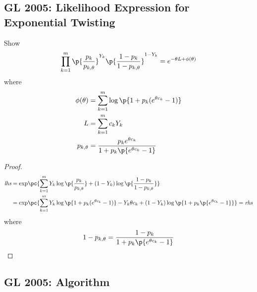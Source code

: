 \documentclass[11pt]{article}
\begin{document}
\newpage

\subsection*{GL 2005: Likelihood Expression for Exponential Twisting}

Show
\[
    \prod_{k=1}^m \p{\frac{p_k}{p_{k, \theta}}}^{Y_k} \p{\frac{1 - p_k}{1 - p_{k, \theta}}}^{1 - Y_k}
    = e^{-\theta L + \phi(\theta)}
\]
where
\begin{align*}
    \phi(\theta) 
        &= \sum_{k=1}^m \log \p{1 + p_k (e^{\theta c_k} - 1)} \\
    L 
        &= \sum_{k=1}^m c_kY_k    \\ 
    p_{k,\theta} 
        &= \frac{p_k e^{\theta c_k}}{1 + p_k\p{e^{\theta c_k}-1}}
\end{align*}
\begin{proof}
    \begin{align*}
        \textit{lhs}
        &= \text{exp} \pc{
            \sum_{k=1}^m Y_k \log \p{\frac{p_k}{p_{k,\theta}}} + (1 - Y_k) \log \p{\frac{1-p_k}{1-p_{k,\theta}}}
        } \\ 
        &= \text{exp} \pc{
            \sum_{k=1}^m Y_k \log \p{1 + p_k (e^{\theta c_k} - 1)} - Y_k \theta c_k + (1 - Y_k) \log \p{1 + p_k\p{e^{\theta c_k} - 1}}
        } = \textit{rhs} \\
    \end{align*}
    where 
    \[
        1 - p_{k,\theta} = \frac{1-p_k}{1 + p_k\p{e^{\theta c_k}-1}}
    \]
\end{proof}


\newpage 

\subsection*{GL 2005: Algorithm}
\end{document}
